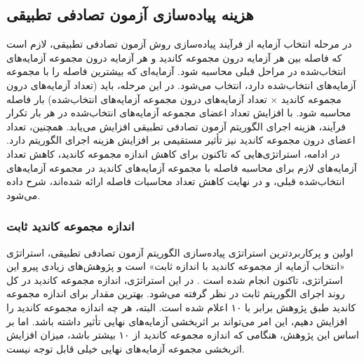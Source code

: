 \subsection{هزینه پیاده‌سازی آزمون تصادفی تطبیقی}
در مرحله انتخاب آزمایه از فرآیند پیاده‌سازی روش آزمون تصادفی تطبیقی، لازم است که فاصله بین هر آزمایه درون مجموعه کاندید و هر آزمایه درون مجموعه آزمایه‌های انتخاب‌شده در مراحل قبلی محاسبه شود. آزمایه‌ای که بیشترین فاصله را با مجموعه آزمایه‌های انتخاب‌شده دارد، انتخاب می‌شود. در این مرحله، باید (تعداد آزمایه‌های درون مجموعه کاندید × تعداد آزمایه‌های درون مجموعه آزمایه‌های انتخاب‌شده) بار فاصله محاسبه شود. با افزایش تعداد اعضای مجموعه آزمایه‌های انتخاب‌شده در هر بار تکرار فرآیند، هزینه اجرای الگوریتم آزمون تصادفی تطبیقی افزایش می‌یابد. همچنین، تعداد اعضای درون مجموعه کاندید نیز تأثیر مستقیمی بر افزایش هزینه اجرای الگوریتم دارد. در ادامه، استراتژی‌هایی که تاکنون برای کاهش اندازه مجموعه کاندید، کاهش تعداد آزمایه‌های لازم برای محاسبه فاصله با مجموعه آزمایه‌های کاندید در مجموعه آزمایه‌های انتخاب‌شده قبلی، و در نهایت کاهش تعداد محاسبات فاصله ارائه شده‌اند، شرح داده می‌شود.

\subsubsection{اندازه مجموعه کاندید ثابت}
اولین و پرکاربردترین استراتژی پیاده‌سازی الگوریتم آزمون تصادفی تطبیقی، استراتژی «انتخاب آزمایه از مجموعه کاندید با اندازه ثابت\cite{chen2001proportional}» است و پژوهش‌های زیادی پیرو این استراتژی، تاکنون انجام شده است
\cite{chen2007test}
\cite{kuo2008enhancing}
\cite{chen2007distribution}
\cite{keele2007guidelines}. 
در این استراتژی، اندازه مجموعه کاندید در کل روند اجرای الگوریتم ثابت در نظر گرفته می‌شود. بهترین مقدار برای اندازه مجموعه کاندید طبق پژوهش \cite{chen2005adaptive} برابر با ۱۰ اعلام شده است. البته، هر چه اندازه مجموعه کاندید را افزایش دهیم، این امر می‌تواند بر اثربخشی آزمایه‌های نهایی تأثیر داشته باشد. اما بر اساس این پژوهش، هنگامی که اندازه مجموعه کاندید از ۱۰ بیشتر باشد، میزان افزایش اثربخشی مجموعه آزمایه‌های نهایی خیلی قابل توجه نیست.

